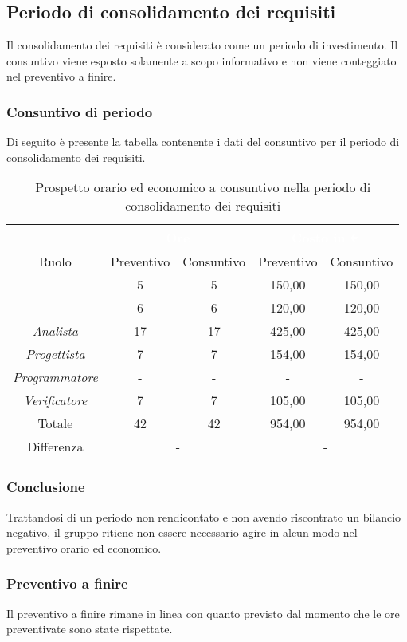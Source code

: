 \subsection{Periodo di consolidamento dei requisiti}
Il consolidamento dei requisiti è considerato come un periodo di investimento. Il consuntivo viene esposto solamente a scopo informativo e non viene conteggiato nel preventivo a finire.
\subsubsection{Consuntivo di periodo}
Di seguito è presente la tabella contenente i dati del consuntivo per il periodo di consolidamento dei requisiti.
\begin{table}[H]
	\centering
	\begin{tabular}{|c|c|c|c|c|}
		\rowcolor{darkblue} 
		&\multicolumn{2}{c|}{\textcolor{white}{Ore}}&\multicolumn{2}{c|}{\textcolor{white}{Costo in €}}\\ \hline
		Ruolo			&	Preventivo				&	Consuntivo		&	Preventivo	&	Consuntivo\\ \hline
		{\Responsabile}		&	5					&	5				&	150,00		&	150,00 \\ \hline
		{\Amministratore}	&	6					&	6				&	120,00		&	120,00 \\ \hline
		\textit{Analista}	&	17					&	17				&	425,00		&	425,00 \\ \hline
		\textit{Progettista}& 	7					&	7 				& 	154,00		&  	154,00 \\ \hline
		\textit{Programmatore}& -					& 	-				& 	-			&  	- \\ \hline
		\textit{Verificatore}&	7					&	7				&	105,00		&	105,00 \\ \hline
		Totale				&	42					&	42				&	954,00		&	954,00 \\ \hline
		Differenza			& 	\multicolumn{2}{c|}{-} 			&\multicolumn{2}{c|}{-}\\ \hline
	\end{tabular}
	\caption{Prospetto orario ed economico a consuntivo nella periodo di consolidamento dei requisiti}
\end{table}
\subsubsection{Conclusione}
Trattandosi di un periodo non rendicontato e non avendo riscontrato un bilancio negativo, il gruppo {\Gruppo} ritiene non essere necessario agire in alcun modo nel preventivo orario ed economico.
\subsubsection{Preventivo a finire}
Il preventivo a finire rimane in linea con quanto previsto dal momento che le ore preventivate sono state rispettate.